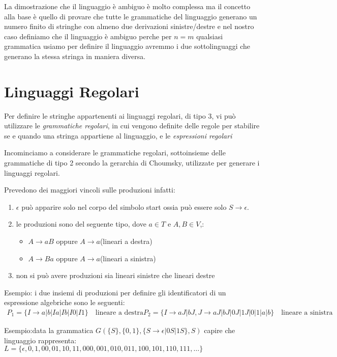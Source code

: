 \documentclass[a4paper]{report}
\theoremstyle{definition}%
\begin{document}
  La dimostrazione che il linguaggio è ambiguo è molto complessa ma il concetto alla base è quello di provare che tutte le grammatiche
  del linguaggio generano un numero finito di stringhe con almeno due derivazioni sinistre/destre e nel nostro caso definiamo che il
  linguaggio è ambiguo perche per $n = m$ qualsiasi grammatica usiamo per definire il linguaggio avremmo i due sottolinguaggi che generano
  la stessa stringa in maniera diversa.

  \chapter{Linguaggi Regolari}
  Per definire le stringhe appartenenti ai linguaggi regolari, di tipo 3, vi può utilizzare le \emph{grammatiche regolari},
  in cui vengono definite delle regole per stabilire se e quando una stringa appartiene al linguaggio, e le \emph{espressioni regolari}

  Incominciamo a considerare le grammatiche regolari, sottoinsieme delle grammatiche di tipo 2 secondo la gerarchia di Choumsky,
  utilizzate per generare i linguaggi regolari.
  
  Prevedono dei maggiori vincoli sulle produzioni infatti:
  \begin{enumerate}
  \item $\epsilon$ può apparire solo nel corpo del simbolo start ossia può essere solo $S \to \epsilon$.
  \item le produzioni sono del seguente tipo, dove $a \in T$ e $A, B \in V$,:
    \begin{itemize}
    \item $A \to aB$ oppure $A \to a$(lineari a destra)
    \item $A \to Ba$ oppure $A \to a$(lineari a sinistra)
      \end{itemize}
  \item non si può avere produzioni sia lineari sinistre che lineari destre
  \end{enumerate}

  Esempio: i due insiemi di produzioni per definire gli identificatori di un espressione algebriche sono le seguenti:
  \begin{align*}
    P_1 = \{I \to a | b | Ia| Ib| I0 | I1\} \quad \text{lineare a destra}
    P_2 = \{I \to aJ | bJ, J \to aJ | bJ | 0J | 1J | 0 | 1 | a | b\} \quad \text{lineare a sinistra}
  \end{align*}

  Esempio:data la grammatica $G(\{S\},\{0,1\},\{S \to \epsilon | 0S | 1S\},S)$ capire che linguaggio rappresenta:
  $L = \{\epsilon, 0, 1, 00, 01, 10, 11, 000, 001, 010, 011, 100, 101, 110, 111, \dots \}$
\end{document}
